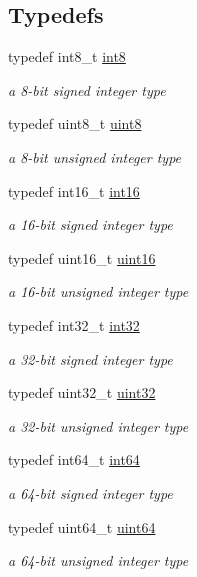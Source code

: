 \subsection*{Typedefs}
\begin{DoxyCompactItemize}
\item 
typedef int8\-\_\-t \hyperlink{namespacechaos_a56015674cfe4ad1fc583c3da6c724d8a}{int8}
\begin{DoxyCompactList}\small\item\em a 8-\/bit signed integer type \end{DoxyCompactList}\item 
typedef uint8\-\_\-t \hyperlink{namespacechaos_a229e18634387996c2712d57f184bf363}{uint8}
\begin{DoxyCompactList}\small\item\em a 8-\/bit unsigned integer type \end{DoxyCompactList}\item 
typedef int16\-\_\-t \hyperlink{namespacechaos_a23112b8188c8a6ad32a86041fb4c088e}{int16}
\begin{DoxyCompactList}\small\item\em a 16-\/bit signed integer type \end{DoxyCompactList}\item 
typedef uint16\-\_\-t \hyperlink{namespacechaos_ac3888b1c9e56da7fbbdb3ab8425b4068}{uint16}
\begin{DoxyCompactList}\small\item\em a 16-\/bit unsigned integer type \end{DoxyCompactList}\item 
typedef int32\-\_\-t \hyperlink{namespacechaos_ad1de7efb430365afd2c9446a0f522a90}{int32}
\begin{DoxyCompactList}\small\item\em a 32-\/bit signed integer type \end{DoxyCompactList}\item 
typedef uint32\-\_\-t \hyperlink{namespacechaos_a3b3a47ba1e284655bf1a30c441121c60}{uint32}
\begin{DoxyCompactList}\small\item\em a 32-\/bit unsigned integer type \end{DoxyCompactList}\item 
typedef int64\-\_\-t \hyperlink{namespacechaos_a46c61f58d99879b936f58234b9a05e0c}{int64}
\begin{DoxyCompactList}\small\item\em a 64-\/bit signed integer type \end{DoxyCompactList}\item 
typedef uint64\-\_\-t \hyperlink{namespacechaos_a34fe5f5bfc3ef6d80b5d094ed91b4d6e}{uint64}
\begin{DoxyCompactList}\small\item\em a 64-\/bit unsigned integer type \end{DoxyCompactList}\end{DoxyCompactItemize}


